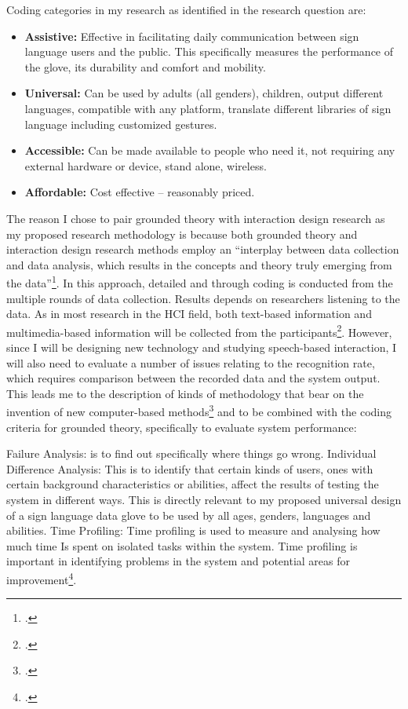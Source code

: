 Coding categories in my research as identified in the research question are:
\begin{itemize}
    \item \textbf{Assistive:} Effective in facilitating daily communication between sign language users and the public. This specifically measures the performance of the glove, its durability and comfort and mobility.
    \item \textbf{Universal:} Can be used by adults (all genders), children, output different languages, compatible with any platform, translate different libraries of sign language including customized gestures.
    \item \textbf{Accessible:} Can be made available to people who need it, not requiring any external hardware or device, stand alone, wireless.
    \item \textbf{Affordable:} Cost effective – reasonably priced.
\end{itemize}

The reason I chose to pair grounded theory with interaction design research as my proposed research methodology is because both grounded theory and interaction design research methods employ an ``interplay between data collection and data analysis, which results in the concepts and theory truly emerging from the data''\footcite{Lazar2010}. In this approach, detailed and through coding is conducted from the multiple rounds of data collection. Results depends on researchers listening to the data. As in most research in the HCI field, both text-based information and multimedia-based information will be collected from the participants\footcite{Lazar2010}. 
However, since I will be designing new technology and studying speech-based interaction, I will also need to evaluate a number of issues relating to the recognition rate, which requires comparison between the recorded data and the system output. 
This leads me to the description of kinds of methodology that bear on the invention of new computer-based methods\footcite{Rogers2011} and to be combined with the coding criteria for grounded theory, specifically to evaluate system performance: 

Failure Analysis: is to find out specifically where things go wrong. 
Individual Difference Analysis: This is to identify that certain kinds of users, ones with certain background characteristics or abilities, affect the results of testing the system in different ways. This is directly relevant to my proposed universal design of a sign language data glove to be used by all ages, genders, languages and abilities. 
Time Profiling: Time profiling is used to measure and analysing how much time Is spent on isolated tasks within the system. Time profiling is important in identifying problems in the system and potential areas for improvement\footcite{Cox2008}. 

